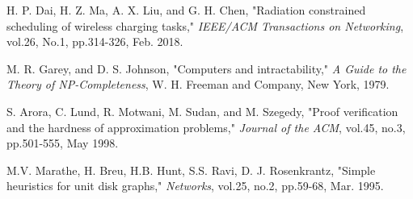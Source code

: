 \documentclass[journal,10pt]{IEEEtran}
\begin{document}
\begin{thebibliography}{11}
H. P. Dai, H. Z. Ma, A. X. Liu, and G. H. Chen, "Radiation constrained scheduling of wireless charging tasks," \textit{IEEE/ACM Transactions on Networking}, vol.26, No.1, pp.314-326, Feb. 2018.

M. R. Garey, and D. S. Johnson, "Computers and intractability," \textit{A Guide to the Theory of NP-Completeness}, W. H. Freeman and Company, New York, 1979.

S. Arora, C. Lund, R. Motwani, M. Sudan, and M. Szegedy, "Proof verification and the hardness of approximation problems," \textit{Journal of the ACM}, vol.45, no.3, pp.501-555, May 1998.

M.V. Marathe, H. Breu, H.B. Hunt, S.S. Ravi, D. J. Rosenkrantz, "Simple heuristics for unit disk graphs," \textit{Networks}, vol.25, no.2, pp.59-68, Mar. 1995.

\end{thebibliography}


\end{document}
